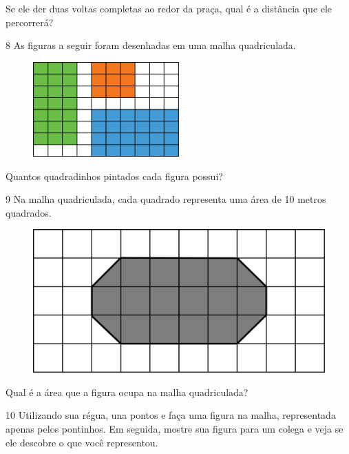 Se ele der duas voltas completas ao redor da praça, qual é a distância que ele percorrerá?


\pagebreak
\num{8} As figuras a seguir foram desenhadas em uma malha quadriculada.

\begin{figure}[htpb!]
\centering
\includegraphics[width=0.5\textwidth]{./media/image56.png}
\end{figure}

Quantos quadradinhos pintados cada figura possui?


\num{9} Na malha quadriculada, cada quadrado representa uma área de 10 metros quadrados.

\begin{figure}[htpb!]
\centering
\includegraphics[width=.6\textwidth]{./media/image60.png}
\end{figure}

Qual é a área que a figura ocupa na malha quadriculada?


\vspace{2em}

\num{10} Utilizando sua régua, una pontos e faça uma figura na malha, representada apenas pelos pontinhos. Em seguida, mostre sua
figura para um colega e veja se ele descobre o que você representou.

